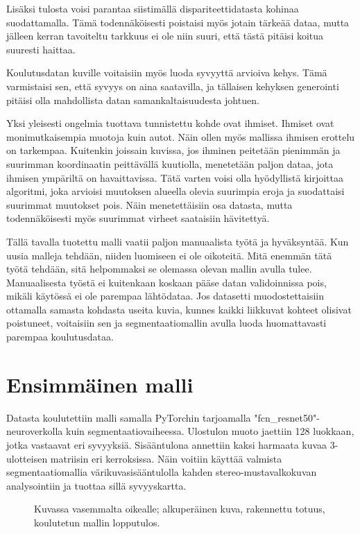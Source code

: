 Lisäksi tulosta voisi parantaa siistimällä dispariteettidatasta kohinaa suodattamalla.
Tämä todennäköisesti poistaisi myös jotain tärkeää dataa,
mutta jälleen kerran tavoiteltu tarkkuus ei ole niin suuri, että tästä pitäisi koitua suuresti haittaa.

Koulutusdatan kuville voitaisiin myös luoda syvyyttä arvioiva kehys.
Tämä varmistaisi sen, että syvyys on aina saatavilla, 
ja tällaisen kehyksen generointi pitäisi olla mahdollista datan samankaltaisuudesta johtuen.

Yksi yleisesti ongelmia tuottava tunnistettu kohde ovat ihmiset.
Ihmiset ovat monimutkaisempia muotoja kuin autot.
Näin ollen myös mallissa ihmisen erottelu on tarkempaa.
Kuitenkin joissain kuvissa,
jos ihminen peitetään pienimmän ja suurimman koordinaatin peittävällä kuutiolla,
menetetään paljon dataa, jota ihmisen ympäriltä on havaittavissa.
Tätä varten voisi olla hyödyllistä kirjoittaa algoritmi, joka arvioisi muutoksen alueella olevia suurimpia eroja ja suodattaisi suurimmat muutokset pois.
Näin menetettäisiin osa datasta,
mutta todennäköisesti myös suurimmat virheet saataisiin hävitettyä. 

Tällä tavalla tuotettu malli vaatii paljon manuaalista työtä ja hyväksyntää.
Kun uusia malleja tehdään, niiden luomiseen ei ole oikoteitä.
Mitä enemmän tätä työtä tehdään,
sitä helpommaksi se olemassa olevan mallin avulla tulee.
Manuaalisesta työstä ei kuitenkaan koskaan pääse datan validoinnissa pois,
mikäli käytössä ei ole parempaa lähtödataa.
Jos datasetti muodostettaisiin ottamalla samasta kohdasta useita kuvia,
kunnes kaikki liikkuvat kohteet olisivat poistuneet,
voitaisiin sen ja segmentaatiomallin avulla luoda huomattavasti parempaa koulutusdataa. 

\section{Ensimmäinen malli}

Datasta koulutettiin malli samalla PyTorchin tarjoamalla "fcn\_resnet50"-neuroverkolla \cite{pytorchfcnresnet50} kuin segmentaatiovaiheessa.
Ulostulon muoto jaettiin 128 luokkaan, jotka vastaavat eri syvyyksiä.
Sisääntulona annettiin kaksi harmaata kuvaa 3-ulotteisen matriisin eri kerroksissa.
Näin voitiin käyttää valmista segmentaatiomallia värikuvasisääntulolla kahden stereo-mustavalkokuvan analysointiin ja tuottaa sillä syvyyskartta.

\begin{figure}[h]
\centering
{}
\caption{Kuvassa vasemmalta oikealle; alkuperäinen kuva, rakennettu totuus, koulutetun mallin lopputulos.}
\label{fig:model}
\end{figure}

